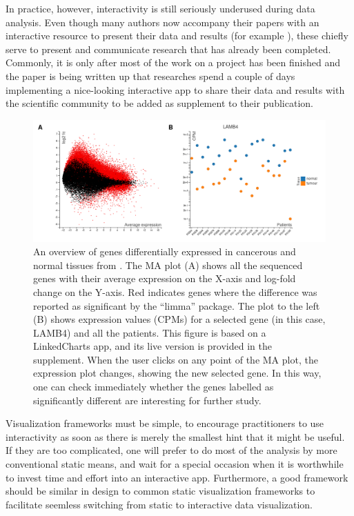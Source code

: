 \documentclass[twocolumn,10pt]{article}
\begin{document}
In practice, however, interactivity is still seriously underused during data analysis. Even though many authors now accompany their papers with an interactive resource to present their data and results (for example \citet{travaglini_2020, roider_2020, kalucka_2020}), these chiefly serve to present and communicate research that has already been completed. Commonly, it is only after most of the work on a project has been finished and the paper is being written up that researches spend a couple of days implementing a nice-looking interactive app to share their data and results with the scientific community \citep{batch_2017} to be added as supplement to their publication. 

\begin{figure}[b]
	\includegraphics[width=\textwidth]{FigD/figD.png}
	\caption{An overview of genes differentially expressed in cancerous and normal tissues from \citet{conway_2015}. The MA plot (A) shows all the sequenced genes with their average expression on the X-axis and log-fold change on the Y-axis. Red indicates genes where the difference was reported as significant by the ``limma''  \citep{ritchie_2015}  package. The plot to the left (B) shows expression values (CPMs) for a selected gene (in this case, LAMB4) and all the patients. This figure is based on a LinkedCharts app, and its live version is provided in the supplement. When the user clicks on any point of the MA plot, the expression plot changes, showing the new selected gene. In this way, one can check immediately whether the genes labelled as significantly different are interesting for further study.}  
	\label{FigD}
\end{figure}

Visualization frameworks must be simple, to encourage practitioners to use interactivity as soon as there is merely the smallest hint that it might be useful. If they are too complicated, one will prefer to do most of the analysis by more conventional static means, and wait for a special occasion when it is worthwhile to invest time and effort into an interactive app. Furthermore, a good framework should be similar in design to common static visualization frameworks to facilitate seemless switching from static to interactive data visualization.
\end{document}
